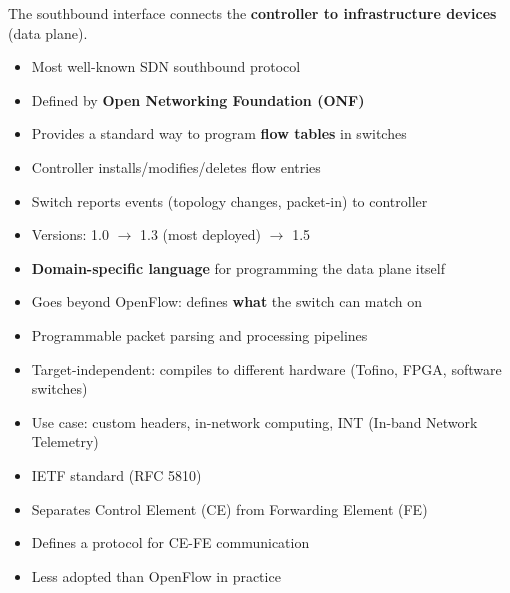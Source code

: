 
The southbound interface connects the \textbf{controller to infrastructure devices} (data plane).


\begin{itemize}
\tightlist
\item
  Most well-known SDN southbound protocol
\item
  Defined by \textbf{Open Networking Foundation (ONF)}
\item
  Provides a standard way to program \textbf{flow tables} in switches
\item
  Controller installs/\allowbreak{}modifies/\allowbreak{}deletes flow entries
\item
  Switch reports events (topology changes, packet-in) to controller
\item
  Versions: 1.0 \ensuremath{\to} 1.3 (most deployed) \ensuremath{\to} 1.5
\end{itemize}


\begin{itemize}
\tightlist
\item
  \textbf{Domain-specific language} for programming the data plane itself
\item
  Goes beyond OpenFlow: defines \textbf{what} the switch can match on
\item
  Programmable packet parsing and processing pipelines
\item
  Target-independent: compiles to different hardware (Tofino, FPGA, software switches)
\item
  Use case: custom headers, in-network computing, INT (In-band Network Telemetry)
\end{itemize}


\begin{itemize}
\tightlist
\item
  IETF standard (RFC 5810)
\item
  Separates Control Element (CE) from Forwarding Element (FE)
\item
  Defines a protocol for CE-FE communication
\item
  Less adopted than OpenFlow in practice
\end{itemize}

